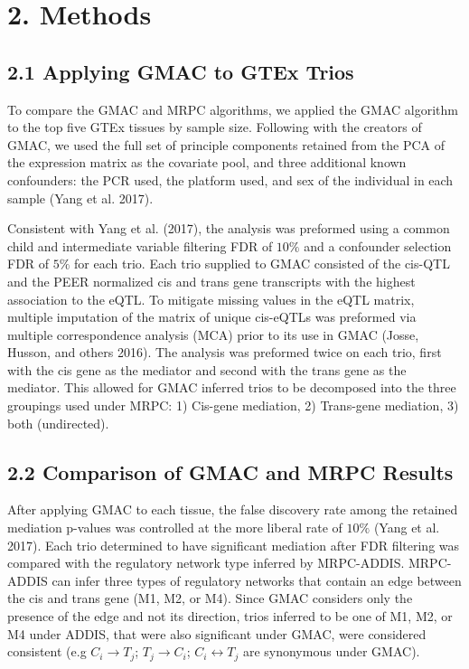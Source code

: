 \documentclass[
]{article}
\begin{document}
\section*{2. Methods}
\subsection*{2.1 Applying GMAC to GTEx Trios}

To compare the GMAC and MRPC algorithms, we applied the GMAC algorithm
to the top five GTEx tissues by sample size. Following with the creators
of GMAC, we used the full set of principle components retained from the
PCA of the expression matrix as the covariate pool, and three additional
known confounders: the PCR used, the platform used, and sex of the
individual in each sample (Yang et al. 2017).

Consistent with Yang et al. (2017), the analysis was preformed using a
common child and intermediate variable filtering FDR of \(10\%\) and a
confounder selection FDR of \(5\%\) for each trio. Each trio supplied to
GMAC consisted of the cis-QTL and the PEER normalized cis and trans gene
transcripts with the highest association to the eQTL. To mitigate
missing values in the eQTL matrix, multiple imputation of the matrix of
unique cis-eQTLs was preformed via multiple correspondence analysis
(MCA) prior to its use in GMAC (Josse, Husson, and others 2016). The
analysis was preformed twice on each trio, first with the cis gene as
the mediator and second with the trans gene as the mediator. This
allowed for GMAC inferred trios to be decomposed into the three
groupings used under MRPC: 1) Cis-gene mediation, 2) Trans-gene
mediation, 3) both (undirected).

\subsection*{2.2 Comparison of GMAC and MRPC Results}

After applying GMAC to each tissue, the false discovery rate among the
retained mediation p-values was controlled at the more liberal rate of
\(10\%\) (Yang et al. 2017). Each trio determined to have significant
mediation after FDR filtering was compared with the regulatory network
type inferred by MRPC-ADDIS. MRPC-ADDIS can infer three types of
regulatory networks that contain an edge between the cis and trans gene
(M1, M2, or M4). Since GMAC considers only the presence of the edge and
not its direction, trios inferred to be one of M1, M2, or M4 under
ADDIS, that were also significant under GMAC, were considered consistent
(e.g \(C_i \rightarrow T_j\); \(T_j \rightarrow C_i\);
\(C_i \leftrightarrow T_j\) are synonymous under GMAC).
\end{document}
